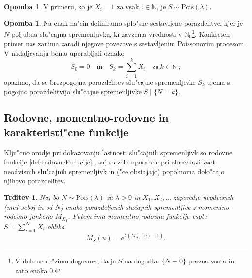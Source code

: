 \documentclass[12pt, a4paper, reqno]{amsart}
\theoremstyle{definition}
\newtheorem{opomba}[definicija]{Opomba}
\theoremstyle{plain}
\newtheorem{trditev}[definicija]{Trditev}
\newcommand{\N}{\mathbb{N}}
\newcommand{\1}{\mathds{1}}
\newcommand{\Pois}[1]{\text{Pois}(#1)}
\newcommand*{\refPriloga}[1]{%
  \begingroup
    \hypersetup{
      linkcolor=red,
      linkbordercolor=red,
    }%
    \ref{#1}%
  \endgroup
}
\begin{document}
    \begin{opomba}
        V primeru, ko je $X_i = 1$ za vsak $i\in\N$, je $S\sim\Pois{\lambda}$.
    \end{opomba}

    \begin{opomba}
        Na enak na"cin definiramo splo"sne sestavljene porazdelitve, kjer je $N$ poljubna slu"cajna spremenljivka,
        ki zavzema vrednosti v $\N_0$\footnote{V delu se dr"zimo dogovora, da je $S$ na dogodku $\{N=0\}$ prazna vsota in zato 
        enaka $0$.}. Konkreten primer nas zanima zaradi njegove povezave s sestavljenim
        Poissonovim procesom. V nadaljevanju bomo uporabljali oznako
        \begin{equation*}
            S_0 = 0 \quad \text{in} \quad S_k = \sum_{i=1}^kX_i \quad \text{za} \ k\in\N\>; 
        \end{equation*}
        opazimo, da se brezpogojna porazdelitev slu"cajne spremenljivke $S_k$ ujema s pogojno porazdelitvijo 
        slu"cajne spremenljivke $S\mid\{N = k\}$.
        \label{op:gneralCaseCOmpound}
    \end{opomba}

    \subsection{Rodovne, momentno-rodovne in karakteristi"cne funkcije} Klju"cno \newline orodje pri dokazovanju
    lastnosti slu"cajnih spremenljivk so rodovne funkcije \refPriloga{def:rodovneFunkcije}, saj so zelo uporabne
    pri obravnavi vsot neodvisnih slu"cajnih spremenljivk in ("ce obstajajo) popolnoma dolo"cajo njihovo porazdelitev.  

    \begin{trditev}
        Naj bo $N\sim \Pois{\lambda}$  za $\lambda >0$ in $X_1, X_2, \dots$ zaporedje neodvisnih (med seboj in od $N$)
        enako porazdeljenih slučajnih spremenljivk z momentno-rodovno funkcijo $M_{X_1}$. Potem ima 
        momentno-rodovna funkcija vsote $S = \sum_{i=1}^NX_i$ obliko
        \begin{equation*}
            M_{S}(u) = e^{\lambda \left(M_{X_1}(u) - 1\right)}.
        \end{equation*}
        \label{trd:MomentGener}
    \end{trditev}
    
\end{document}
